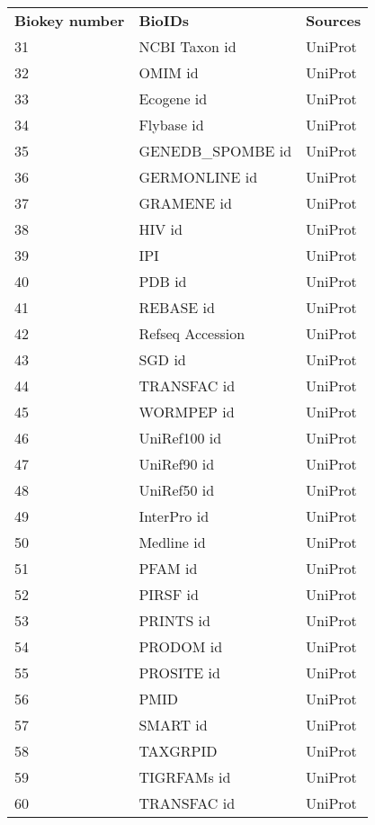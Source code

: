 \documentclass[a4paper]{article}
\begin{document}
\begin{center}
\begin{tabular}{ l l l}
\textbf{Biokey number}	& \textbf{BioIDs} &	\textbf{Sources} \\ 
31	& NCBI Taxon id	& UniProt        \\
32	& OMIM id	& UniProt              \\
33	& Ecogene id &	UniProt          \\
34	& Flybase id	& UniProt          \\
35	& GENEDB\_SPOMBE id	& UniProt    \\
36	& GERMONLINE id	& UniProt        \\
37	& GRAMENE id	& UniProt          \\
38	& HIV id	& UniProt              \\
39	& IPI	& UniProt                  \\
40	& PDB id	& UniProt              \\
41	& REBASE id	& UniProt            \\
42	& Refseq Accession &	UniProt    \\
43	& SGD id &	UniProt              \\
44	& TRANSFAC id	& UniProt          \\
45	& WORMPEP id &	UniProt          \\
46	& UniRef100 id &	UniProt        \\
47	& UniRef90 id &	UniProt          \\
48	& UniRef50 id	& UniProt          \\
49	& InterPro id &	UniProt          \\
50	& Medline id &	UniProt          \\
51	& PFAM id	& UniProt              \\
52	& PIRSF id &	UniProt            \\
53	& PRINTS id	& UniProt            \\
54	& PRODOM id	& UniProt            \\
55	& PROSITE id &	UniProt          \\
56	& PMID	& UniProt                \\
57	& SMART id	& UniProt            \\
58	& TAXGRPID	& UniProt            \\
59	& TIGRFAMs id & UniProt          \\
60	& TRANSFAC id &	UniProt          \\
\end{tabular}
\end{center}
\end{document}
